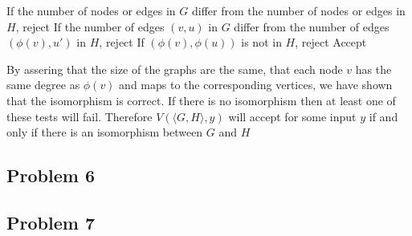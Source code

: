 \documentclass[english]{article}
\begin{document}
\begin{algorithmic}
\State If the number of nodes or edges in $G$ differ from the number of nodes
		or edges in $H$, reject
	\State If the number of edges $(v,u)$ in $G$ differ from the number of
			edges $(\phi(v),u')$ in $H$, reject
		\State If $(\phi(v),\phi(u))$ is not in $H$, reject
	\EndFor
\EndFor
\State Accept
\EndFunction 
\end{algorithmic}

By assering that the size of the graphs are the same, that each node $v$ has
the same degree as $\phi(v)$ and maps to the corresponding vertices, we have
shown that the isomorphism is correct. If there is no isomorphism then at
least one of these tests will fail. Therefore $V(\langle G, H \rangle,y)$
will accept for some input $y$ if and only if there is an isomorphism between
$G$ and $H$

\subsection*{Problem 6}
\subsection*{Problem 7}
\end{document}
